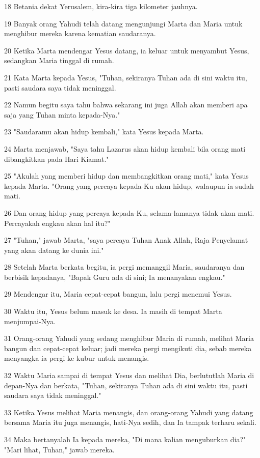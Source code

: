 \par 18 Betania dekat Yerusalem, kira-kira tiga kilometer jauhnya.
\par 19 Banyak orang Yahudi telah datang mengunjungi Marta dan Maria untuk menghibur mereka karena kematian saudaranya.
\par 20 Ketika Marta mendengar Yesus datang, ia keluar untuk menyambut Yesus, sedangkan Maria tinggal di rumah.
\par 21 Kata Marta kepada Yesus, "Tuhan, sekiranya Tuhan ada di sini waktu itu, pasti saudara saya tidak meninggal.
\par 22 Namun begitu saya tahu bahwa sekarang ini juga Allah akan memberi apa saja yang Tuhan minta kepada-Nya."
\par 23 "Saudaramu akan hidup kembali," kata Yesus kepada Marta.
\par 24 Marta menjawab, "Saya tahu Lazarus akan hidup kembali bila orang mati dibangkitkan pada Hari Kiamat."
\par 25 "Akulah yang memberi hidup dan membangkitkan orang mati," kata Yesus kepada Marta. "Orang yang percaya kepada-Ku akan hidup, walaupun ia sudah mati.
\par 26 Dan orang hidup yang percaya kepada-Ku, selama-lamanya tidak akan mati. Percayakah engkau akan hal itu?"
\par 27 "Tuhan," jawab Marta, "saya percaya Tuhan Anak Allah, Raja Penyelamat yang akan datang ke dunia ini."
\par 28 Setelah Marta berkata begitu, ia pergi memanggil Maria, saudaranya dan berbisik kepadanya, "Bapak Guru ada di sini; Ia menanyakan engkau."
\par 29 Mendengar itu, Maria cepat-cepat bangun, lalu pergi menemui Yesus.
\par 30 Waktu itu, Yesus belum masuk ke desa. Ia masih di tempat Marta menjumpai-Nya.
\par 31 Orang-orang Yahudi yang sedang menghibur Maria di rumah, melihat Maria bangun dan cepat-cepat keluar; jadi mereka pergi mengikuti dia, sebab mereka menyangka ia pergi ke kubur untuk menangis.
\par 32 Waktu Maria sampai di tempat Yesus dan melihat Dia, berlututlah Maria di depan-Nya dan berkata, "Tuhan, sekiranya Tuhan ada di sini waktu itu, pasti saudara saya tidak meninggal."
\par 33 Ketika Yesus melihat Maria menangis, dan orang-orang Yahudi yang datang bersama Maria itu juga menangis, hati-Nya sedih, dan Ia tampak terharu sekali.
\par 34 Maka bertanyalah Ia kepada mereka, "Di mana kalian menguburkan dia?" "Mari lihat, Tuhan," jawab mereka.
